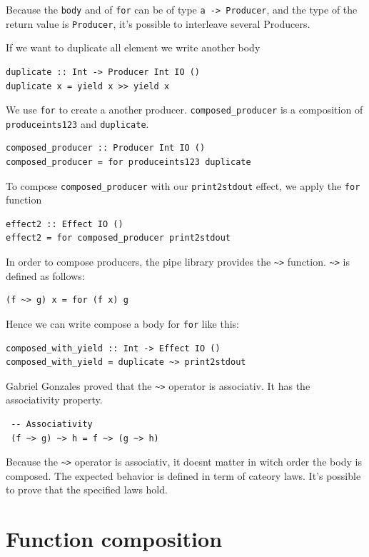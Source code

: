 \documentclass[twoside, a4paper, 12pt]{article}
\begin{document}
Because the \verb|body| and of \verb|for| can be of type \verb|a -> Producer|, and the type of the return value is \verb|Producer|, it's possible to interleave several Producers.

If we want to duplicate all element we write another body
\begin{verbatim}
duplicate :: Int -> Producer Int IO ()
duplicate x = yield x >> yield x 
\end{verbatim}

We use \verb|for| to create a another producer. \verb|composed_producer| is a composition of \verb|produceints123| and \verb|duplicate|.
\begin{verbatim}
composed_producer :: Producer Int IO ()
composed_producer = for produceints123 duplicate
\end{verbatim}

To compose \verb|composed_producer| with our \verb|print2stdout| effect, we apply the \verb|for| function

\begin{verbatim}
effect2 :: Effect IO ()
effect2 = for composed_producer print2stdout
\end{verbatim}

In order to compose producers, the pipe library provides the \verb|~>| function. \verb|~>| is defined as follows:
\begin{verbatim}
(f ~> g) x = for (f x) g
\end{verbatim}

Hence we can write compose a body for \verb|for| like this:
\begin{verbatim}
composed_with_yield :: Int -> Effect IO ()
composed_with_yield = duplicate ~> print2stdout
\end{verbatim}

Gabriel Gonzales proved that the \verb|~>| operator is associativ. It has the associativity property.

\begin{verbatim}
 -- Associativity
 (f ~> g) ~> h = f ~> (g ~> h)
\end{verbatim}

Because the \verb|~>| operator is associativ, it doesnt matter in witch order the body is composed. The expected behavior is defined in term of cateory laws. It's possible to prove that the specified laws hold.

\section{Function composition}
\end{document}
